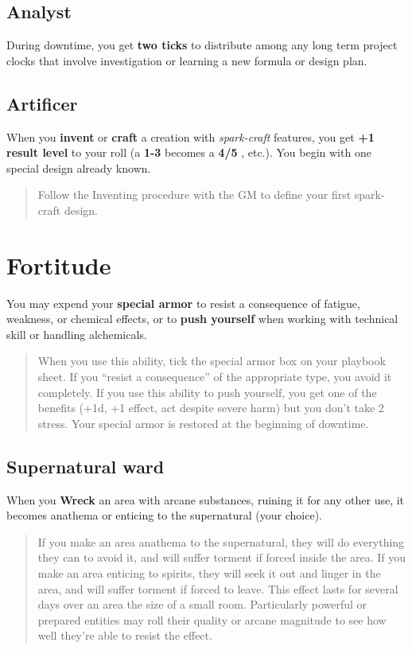 \documentclass[11pt,oneside]{book}
\newcommand{\gameterm}[1]{\textbf{#1}}
\begin{document}
\subsection{Analyst}

During downtime, you get \textbf{two ticks} to distribute among any long term project clocks that involve investigation or learning a new formula or design plan.

\subsection{Artificer}

When you \textbf{invent} or \textbf{craft} a creation with \emph{spark-craft} features, you get \textbf{+1 result level} to your roll (a \gameterm{1-3}  becomes a \gameterm{4/5} , etc.). You begin with one special design already known.

\begin{quote}
	Follow the Inventing procedure with the GM to define your first spark-craft design.
\end{quote} 

\section{Fortitude}

You may expend your \textbf{special armor} to resist a consequence of fatigue, weakness, or chemical effects, or to \textbf{push yourself} when working with technical skill or handling alchemicals.

\begin{quote}
	When you use this ability, tick the special armor box on your playbook sheet. If you “resist a consequence” of the appropriate type, you avoid it completely. If you use this ability to push yourself, you get one of the benefits (+1d, +1 effect, act despite severe harm) but you don’t take 2 stress. Your special armor is restored at the beginning of downtime.
\end{quote} 

\subsection{Supernatural ward}

When you \gameterm{Wreck}  an area with arcane substances, ruining it for any other use, it becomes anathema or enticing to the supernatural (your choice).

\begin{quote}
	If you make an area anathema to the supernatural, they will do everything they can to avoid it, and will suffer torment if forced inside the area. If you make an area enticing to spirits, they will seek it out and linger in the area, and will suffer torment if forced to leave. This effect lasts for several days over an area the size of a small room. Particularly powerful or prepared entities may roll their quality or arcane magnitude to see how well they’re able to resist the effect.
\end{quote} 
\end{document}
